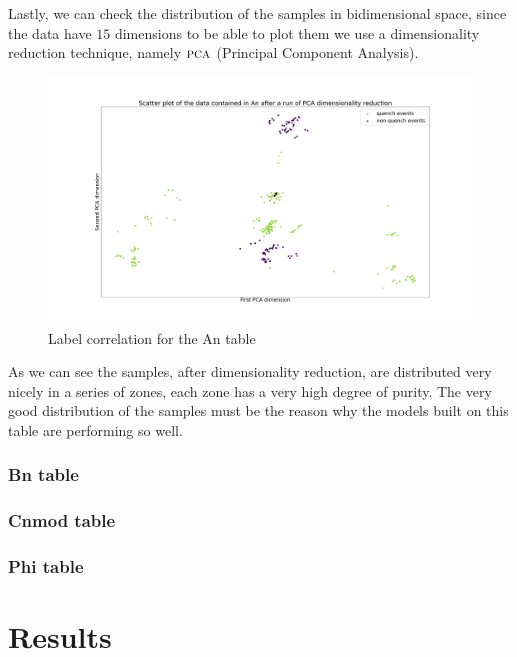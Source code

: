 Lastly, we can check the distribution of the samples in bidimensional space, since the data have
$15$ dimensions to be able to plot them we use a dimensionality reduction technique, namely
$\textsc{pca}$ (Principal Component Analysis).
\begin{figure}
	\centering
	\includegraphics[scale=.23]{img/An_distribution.png}
	\caption{Label correlation for the An table} \label{fig:an-dist}
\end{figure}

As we can see the samples, after dimensionality reduction, are distributed very nicely in a series
of zones, each zone has a very high degree of purity. The very good distribution of the samples must
be the reason why the models built on this table are performing so well.

\subsubsection{Bn table}

\subsubsection{Cnmod table}

\subsubsection{Phi table}

\section{Results}
